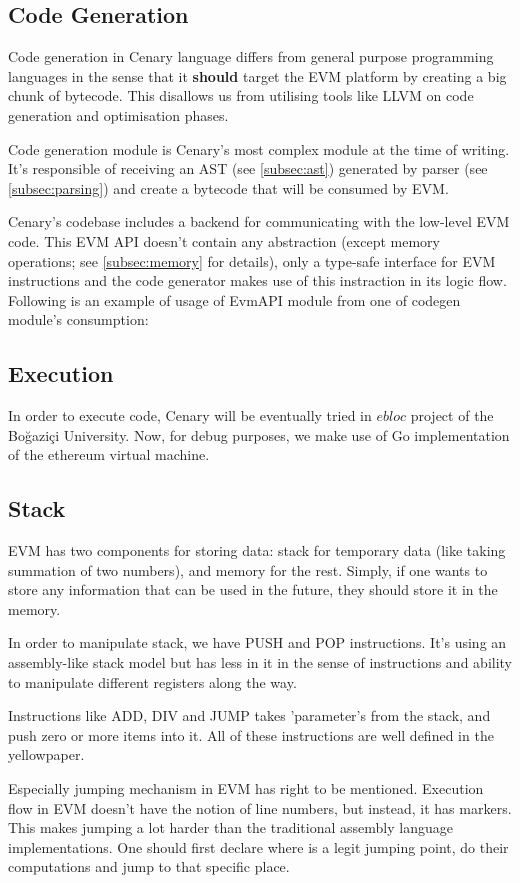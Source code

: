 \documentclass{article}
\begin{document}
\subsection{Code Generation}
\label{subsec:code_generation}
\par Code generation in Cenary language differs from general purpose programming languages in the sense that it \textbf{should} target the EVM platform by creating a big chunk of bytecode. This disallows us from utilising tools like LLVM\cite{llvm} on code generation and optimisation phases.
\par Code generation module is Cenary's most complex module at the time of writing. It's responsible of receiving an AST (see \ref{subsec:ast}) generated by parser (see \ref{subsec:parsing}) and create a bytecode that will be consumed by EVM.
\par Cenary's codebase includes a backend for communicating with the low-level EVM code. This EVM API doesn't contain any abstraction (except memory operations; see \ref{subsec:memory} for details), only a type-safe interface for EVM instructions and the code generator makes use of this instraction in its logic flow. Following is an example of usage of EvmAPI module from one of codegen module's consumption:

\subsection{Execution}
\label{subsec:execution}
In order to execute code, Cenary will be eventually tried in $ebloc$ project of the Boğaziçi University. Now, for debug purposes, we make use of Go\cite{go} implementation of the ethereum virtual machine\cite{ethereum-go}.
\subsection{Stack}
\label{subsec:stack}
EVM has two components for storing data: stack for temporary data (like taking summation of two numbers), and memory for the rest. Simply, if one wants to store any information that can be used in the future, they should store it in the memory.
\par In order to manipulate stack, we have PUSH and POP instructions. It's using an assembly-like stack model but has less in it in the sense of instructions and ability to manipulate different registers along the way.
\par Instructions like ADD, DIV and JUMP takes 'parameter's from the stack, and push zero or more items into it. All of these instructions are well defined in the yellowpaper\cite{yellowpaper}.
\par Especially jumping mechanism in EVM has right to be mentioned. Execution flow in EVM doesn't have the notion of line numbers, but instead, it has markers. This makes jumping a lot harder than the traditional assembly language implementations. One should first declare where is a legit jumping point, do their computations and jump to that specific place.
\end{document}
